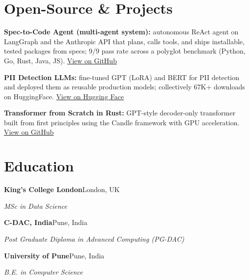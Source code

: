 \documentclass[10pt,a4paper]{article}
\begin{document}
\section{Open-Source \& Projects}
\begin{tight}
  \item \textbf{Spec-to-Code Agent (multi-agent system):} autonomous ReAct agent on LangGraph and the Anthropic API that plans, calls tools, and ships installable, tested packages from specs; 9/9 pass rate across a polyglot benchmark (Python, Go, Rust, Java, JS). \href{https://github.com/abhijeetscode/Spec-to-Code-Agent}{View on GitHub}
  \item \textbf{PII Detection LLMs:} fine-tuned GPT (LoRA) and BERT for PII detection and deployed them as reusable production models; collectively 67K+ downloads on HuggingFace. \href{https://huggingface.co/ab-ai/pii_model}{View on Hugging Face}
  \item \textbf{Transformer from Scratch in Rust:} GPT-style decoder-only transformer built from first principles using the Candle framework with GPU acceleration. \href{https://github.com/abhijeetscode/transformer-rust}{View on GitHub}
\end{tight}

\section{Education}
{\color{company}\bfseries King's College London}\hfill {\color{muted}London, UK}\par
{\itshape MSc in Data Science}\par\vspace{2pt}
{\color{company}\bfseries C-DAC, India}\hfill {\color{muted}Pune, India}\par
{\itshape Post Graduate Diploma in Advanced Computing (PG-DAC)}\par\vspace{2pt}
{\color{company}\bfseries University of Pune}\hfill {\color{muted}Pune, India}\par
{\itshape B.E. in Computer Science}\par
\end{document}
